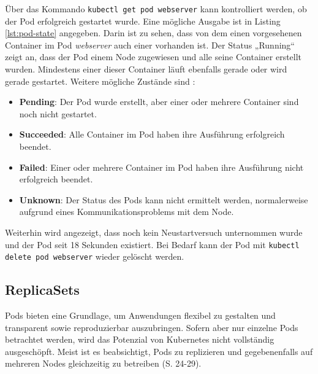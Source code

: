 \documentclass[11pt,a4paper]{article}
\begin{document}
Über das Kommando \lstinline|kubectl get pod webserver| kann kontrolliert werden,
ob der Pod erfolgreich gestartet wurde. Eine mögliche Ausgabe ist in
Listing \ref{lst:pod-state} angegeben. Darin ist zu sehen, dass
von dem einen vorgesehenen Container im Pod \emph{webserver} auch einer vorhanden ist.
Der Status „Running“ zeigt an, dass der Pod einem Node zugewiesen und alle seine Container erstellt wurden.
Mindestens einer dieser Container läuft ebenfalls gerade oder wird gerade gestartet.
Weitere mögliche Zustände sind \cite{kubernetes.io_pod_lifecycle}:
\begin{itemize}
  \item \textbf{Pending}: Der Pod wurde erstellt, aber einer oder mehrere Container sind noch nicht gestartet.
  \item \textbf{Succeeded}: Alle Container im Pod haben ihre Ausführung erfolgreich beendet.
  \item \textbf{Failed}: Einer oder mehrere Container im Pod haben ihre Ausführung nicht erfolgreich beendet.
  \item \textbf{Unknown}: Der Status des Pods kann nicht ermittelt werden, normalerweise aufgrund eines Kommunikationsproblems mit dem Node.
\end{itemize}
Weiterhin wird angezeigt, dass noch kein Neustartversuch unternommen wurde
und der Pod seit 18 Sekunden existiert.
Bei Bedarf kann der Pod mit \lstinline|kubectl delete pod webserver| wieder gelöscht werden.


\subsection{ReplicaSets}
Pods bieten eine Grundlage, um Anwendungen flexibel zu gestalten und
transparent sowie reproduzierbar auszubringen.
Sofern aber nur einzelne Pods betrachtet werden, wird das Potenzial von Kubernetes
nicht vollständig ausgeschöpft.
Meist ist es beabsichtigt, Pods zu replizieren und gegebenenfalls
auf mehreren Nodes gleichzeitig zu betreiben \cite{Schmeling_Dargatz_2022} (S. 24-29).
\end{document}
